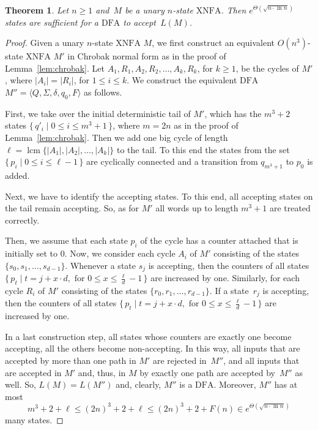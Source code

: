 \documentclass[final,copyright,noderivs]{eptcs}
\theoremstyle{plain}
\newtheorem{theorem}{Theorem}
\theoremstyle{definition}
\DeclareMathOperator{\lcm}{lcm}
\newcommand{\dfa}{\textrm{DFA}}
\newcommand{\xnfa}{\textrm{XNFA}}
\begin{document}
\begin{theorem}\label{theo:unary-xnfa-to-dfa} 
Let $n\geq 1$ and~$M$ be a unary $n$-state $\xnfa$.
Then $e^{\Theta(\sqrt{n\cdot\ln n})}$ states are sufficient 
for a $\dfa$ to accept~$L(M)$. 
\end{theorem}

\begin{proof}
Given a unary $n$-state $\xnfa$ $M$, we first construct an
equivalent $O(n^3)$-state $\xnfa$ $M'$ in Chrobak normal form 
as in the proof of Lemma~\ref{lem:chrobak}.
Let $A_1,R_1,A_2,R_2,\dots , A_k,R_k$, for $k\geq 1$, be the cycles
of $M'$, where \mbox{$|A_i|=|R_i|$,} for $1\leq i\leq k$.
%
We construct the equivalent 
$\dfa$ $M''= \langle Q,\Sigma,\delta,q_0,F\rangle$ as follows.

\begin{sloppypar}
First, we take over the initial deterministic tail of $M'$, which 
has the $m^3+2$ states \mbox{$\{\, q'_i \mid 0\leq i\leq m^3+1\,\}$,}
where $m=2n$ as in the proof of Lemma~\ref{lem:chrobak}.
Then we add one big cycle of length
\mbox{$\ell = \lcm\{|A_1|,|A_2|,\dots , |A_k|\}$} to the tail. 
To this end the states from the set \mbox{$\{\, p_i \mid 0\leq i\leq \ell-1\,\}$}
are cyclically connected and a transition from $q_{m^3+1}$ to $p_0$ is added. 
\end{sloppypar}

Next, we have to identify the accepting states. To this end, all accepting
states on the tail remain accepting. So, as for $M'$ all words up to length
$m^3+1$ are treated correctly.

Then, we assume that each state $p_i$ of the cycle has a counter attached that 
is initially set to $0$. Now, we consider each cycle $A_i$ of $M'$
consisting of the states $\{s_{0}, s_{1},\dots ,s_{d-1}\}$.
Whenever a state $s_j$ is accepting, then the counters of all
states $\{\, p_t \mid t=j+ x\cdot d, \text{ for } 0\leq x \leq \frac{\ell}{d}-1\,\}$
are increased by one. Similarly, for each cycle $R_i$ of $M'$
consisting of the states $\{r_{0}, r_{1},\dots ,r_{d-1}\}$.
If a state~$r_j$ is accepting, then the counters of all
states \mbox{$\{\, p_t \mid t=j+ x\cdot d, \text{ for } 0\leq x \leq \frac{\ell}{d}-1\,\}$}
are increased by one.

In a last construction step, all states whose counters are exactly one
become accepting, all the others become non-accepting. In this way, all inputs
that are accepted by more than one path in $M'$ are rejected in~$M''$, and all
inputs that are accepted in $M'$ and, thus, in $M$ by exactly one path are
accepted by~$M''$ as well. So, $L(M)=L(M'')$ and, clearly, $M''$ is a $\dfa$.
Moreover, $M''$ has at most 
$$
m^3+2+\ell \leq (2n)^3+2+\ell\leq (2n)^3+2+F(n)
\in e^{\Theta(\sqrt{n\cdot\ln n})}
$$ 
many states.
\end{proof}
\end{document}

